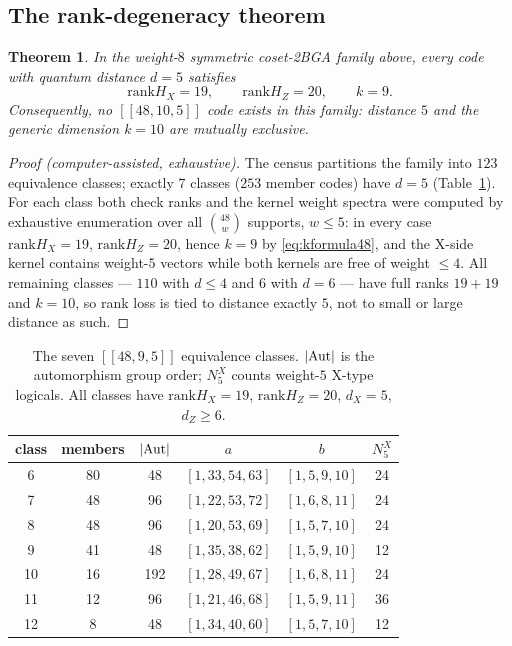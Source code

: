 \documentclass[journal,onecolumn]{IEEEtran}
\newtheorem{theorem}{Theorem}
\theoremstyle{definition}
\theoremstyle{remark}
\newcommand{\rank}{\mathrm{rank}}
\begin{document}
\subsection{The rank-degeneracy theorem}
\begin{theorem}\label{thm:rank-degeneracy}
In the weight-$8$ symmetric coset-2BGA family above, every code with
quantum distance $d=5$ satisfies
\[
\rank H_X=19,\qquad \rank H_Z=20,\qquad k=9.
\]
Consequently, no $[[48,10,5]]$ code exists in this family: distance $5$
and the generic dimension $k=10$ are mutually exclusive.
\end{theorem}
\begin{proof}[Proof (computer-assisted, exhaustive)]
The census partitions the family into $123$ equivalence classes; exactly
$7$ classes ($253$ member codes) have $d=5$ (Table~\ref{tab:d5-spectra}).
For each class both check ranks and the kernel weight spectra were
computed by exhaustive enumeration over all $\binom{48}{w}$ supports,
$w\le5$: in every case $\rank H_X=19$, $\rank H_Z=20$, hence $k=9$ by
\eqref{eq:kformula48}, and the X-side kernel contains weight-$5$ vectors
while both kernels are free of weight $\le4$. All remaining classes ---
$110$ with $d\le4$ and $6$ with $d=6$ --- have full ranks $19+19$ and
$k=10$, so rank loss is tied to distance exactly $5$, not to small or
large distance as such.
\end{proof}

\begin{table}[t]
\centering
\caption{The seven $[[48,9,5]]$ equivalence classes. $|{\rm Aut}|$ is the
automorphism group order; $N_5^X$ counts weight-$5$ X-type logicals.
All classes have $\rank H_X=19$, $\rank H_Z=20$, $d_X=5$, $d_Z\ge6$.}
\label{tab:d5-spectra}
\renewcommand{\arraystretch}{1.15}
\begin{tabular}{@{}cccccc@{}}
\toprule
class & members & $|{\rm Aut}|$ & $a$ & $b$ & $N_5^X$ \\
\midrule
6  & 80 & 48  & $[1,33,54,63]$ & $[1,5,9,10]$  & 24 \\
7  & 48 & 96  & $[1,22,53,72]$ & $[1,6,8,11]$  & 24 \\
8  & 48 & 96  & $[1,20,53,69]$ & $[1,5,7,10]$  & 24 \\
9  & 41 & 48  & $[1,35,38,62]$ & $[1,5,9,10]$  & 12 \\
10 & 16 & 192 & $[1,28,49,67]$ & $[1,6,8,11]$  & 24 \\
11 & 12 & 96  & $[1,21,46,68]$ & $[1,5,9,11]$  & 36 \\
12 & 8  & 48  & $[1,34,40,60]$ & $[1,5,7,10]$  & 12 \\
\bottomrule
\end{tabular}
\end{table}
\end{document}
